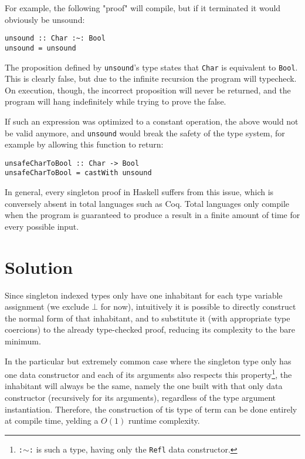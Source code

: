 For example, the following "proof" will compile, but if it terminated it would obviously be unsound:

\begin{lstlisting}[caption=Proving the false through nontermination]
unsound :: Char :~: Bool
unsound = unsound
\end{lstlisting}

The proposition defined by \texttt{unsound}'s type states that \texttt{Char} is equivalent to \texttt{Bool}. This is clearly false, but due to the infinite recursion the program will typecheck. On execution, though, the incorrect proposition will never be returned, and the program will hang indefinitely while trying to prove the false.

If such an expression was optimized to a constant operation, the above would not be valid anymore, and \texttt{unsound} would break the safety of the type system, for example by allowing this function to return:

\begin{lstlisting}
unsafeCharToBool :: Char -> Bool
unsafeCharToBool = castWith unsound
\end{lstlisting}

In general, every singleton proof in Haskell suffers from this issue, which is conversely absent in total languages such as Coq.
Total languages only compile when the program is guaranteed to produce a result in a finite amount of time for every possible input.

\chapter{Solution}
\label{cha:solution}

Since singleton indexed types only have one inhabitant for each type variable assignment (we exclude $\bot$ for now), intuitively it is possible to directly construct the normal form of that inhabitant, and to substitute it (with appropriate type coercions) to the already type-checked proof, reducing its complexity to the bare minimum.

In the particular but extremely common case where the singleton type only has one data constructor and each of its arguments also respects this property\footnote{\texttt{:$\sim$:} is such a type, having only the \texttt{Refl} data constructor.}, the inhabitant will always be the same, namely the one built with that only data constructor (recursively for its arguments), regardless of the type argument instantiation.
Therefore, the construction of tis type of term can be done entirely at compile time, yelding a $O(1)$ runtime complexity.


